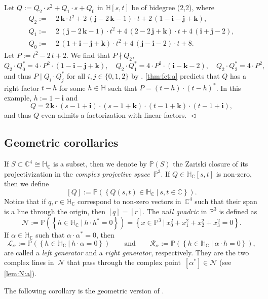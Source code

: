 \documentclass[11pt]{article}
\newcommand{\RL}[2]{\Cref{lem:#1}\ref{lem:#1:#2}}
\newcommand{\C}{\mathbb{C}}
\renewcommand{\H}{\mathbb{H}}
\renewcommand{\P}{\mathbb{P}}
\newcommand{\cN}{\mathcal{N}}
\newcommand{\cL}{\mathcal{L}}
\newcommand{\cR}{\mathcal{R}}
\newcommand{\HC}{\mathbb{H}_{\C}}
\newcommand{\qi}{\mathbf{i}}
\newcommand{\qj}{\mathbf{j}}
\newcommand{\qk}{\mathbf{k}}
\newcommand{\set}[2]{\left\{#1 ~|~ #2\right\}}
\newcommand{\df}{\emph}
\newcommand{\st}{such that }
\newcommand{\END}{\hfill $\vartriangleleft$}
\begin{document}
\begin{example}
\label{exm:fct2}
Let $Q:=Q_2\cdot s^2+Q_1\cdot s+Q_0$ in $\H[s,t]$ be of bidegree (2,2), where
\begin{align*}
Q_2:=&\ 2\,\qk\cdot t^2 + 2\,(\qj - 2\,\qk - 1)\cdot t + 2\, (1 - \qi - \qj + \qk),\\
Q_1:=&\ 2\,(\qj - 2\,\qk - 1)\cdot t^2 + 4\,(2-2\,\qj +\qk)\cdot t+4\,(\qi + \qj - 2), \\
Q_0:=&\ 2\,(1+\qi - \qj + \qk)\cdot t^2 +4\,(\qj - \qi - 2)\cdot t + 8.
\end{align*}
Let $P:=t^2-2\,t+2$. We find that $P\nmid Q_2$,
\[
Q_2\cdot Q_0^*=4\cdot P^2\cdot(1 -\qi - \qj + \qk),\quad
Q_2\cdot Q_1^*=4\cdot P^2\cdot(\qi - \qk - 2),\quad
Q_2\cdot Q_2^*=4\cdot P^2,
\]
and thus $P\mid Q_i\cdot Q_j^*$ for all $i,j\in\{0,1,2\}$ by .
\ref{thm:fct:a} predicts that $Q$ has a right factor $t-h$ for some $h\in\H$
\st $P=(t-h)\cdot(t-h)^*$.
In this example, $h:=1-\qi$ and
\[
Q=2\,\qk\cdot(s-1+\qi)\cdot(s-1+\qk)\cdot(t-1+\qk)\cdot(t-1+\qi),
\]
and thus $Q$ even admits a factorization with linear factors.
\END
\end{example}

\subsection{Geometric corollaries}
\label{sec:clifford}

If $S\subset\C^4\cong\HC$ is a subset,
then we denote by $\P(S)$ the Zariski closure of its projectivization in
the \df{complex projective space}~$\P^3$.
If $Q\in\HC[s,t]$ is non-zero, then we define
\[
[Q]:=\P(\set{Q(s,t)\in\HC}{s,t\in\C}).
\]
Notice that if $q,r\in \HC$ correspond to non-zero vectors in~$\C^4$ \st their span
is a line through the origin,
then $[q]=[r]$.
The \df{null quadric} in $\P^3$ is defined as
\[
\cN:=\P(\set{h\in\HC}{h\cdot h^*=0})=\set{x\in\P^3}{x_0^2+x_1^2+x_2^2+x_3^2=0}.
\]
If $\alpha\in\HC$ such that $\alpha\cdot\alpha^*=0$, then
\[
\cL_\alpha:=\P(\set{h\in\HC}{h\cdot\alpha=0})
\qquad\text{and}\qquad
\cR_\alpha:=\P(\set{h\in\HC}{\alpha\cdot h=0}),
\]
are called a \df{left generator} and a \df{right generator}, respectively.
They are the two complex lines in~$\cN$ that pass through the complex point~$[\alpha^*]\in\cN$
(see \RL{N}{a}).

The following corollary is the geometric version of .
\end{document}
